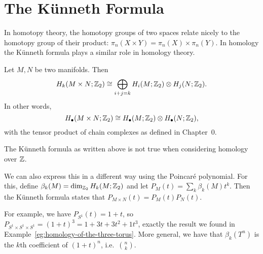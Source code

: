 \section{The Künneth Formula}
In homotopy theory, the homotopy groups of two spaces relate nicely to the homotopy group of their product: $\pi_n(X \times Y) = \pi_n(X) \times \pi_n(Y)$.
In homology the Künneth formula plays a similar role in homology theory.
\begin{theorem}
    Let $M, N$ be two manifolds. Then
    \[
        H_k(M \times N; \mathbb{Z}_2) \cong
        \bigoplus_{i+j  = k} H_i(M; \mathbb{Z}_2) \otimes H_j(N; \mathbb{Z}_2)
    .\]
In other words,
\[
    H_{\bullet}(M \times N; \mathbb{Z}_2) \cong H_{\bullet}(M; \mathbb{Z}_2) \otimes H_\bullet(N; \mathbb{Z}_2)
,\] 
with the tensor product of chain complexes as defined in Chapter~0.
\end{theorem}
\begin{remark}
    The Künneth formula as written above is not true when considering homology over $\mathbb{Z}$.
\end{remark}
\begin{remark}
    We can also express this in a different way using the Poincaré polynomial.
    For this, define $\beta_k(M) = \dim_{\mathbb{Z}_2} H_k(M;\mathbb{Z}_2)$ and let $P_M(t) = \sum_k \beta_k(M) t^{k}$.
    Then the Künneth formula states that $P_{M \times N}(t) = P_M(t) P_N(t)$.

    For example, we have $P_{S^{1}}(t) = 1 + t$, so $P_{S^{1}\times S^{1}\times S^{1}} = (1 + t)^3 = 1 + 3t + 3t^2 + 1t^3$, exactly the result we found in Example~\ref{eg:homology-of-the-three-torus}.
    More general, we have that $\beta_k(T^{n})$ is the $k$th coefficient of $(1+t)^{n}$, i.e.\ $\binom{n}{k}$.
\end{remark}
